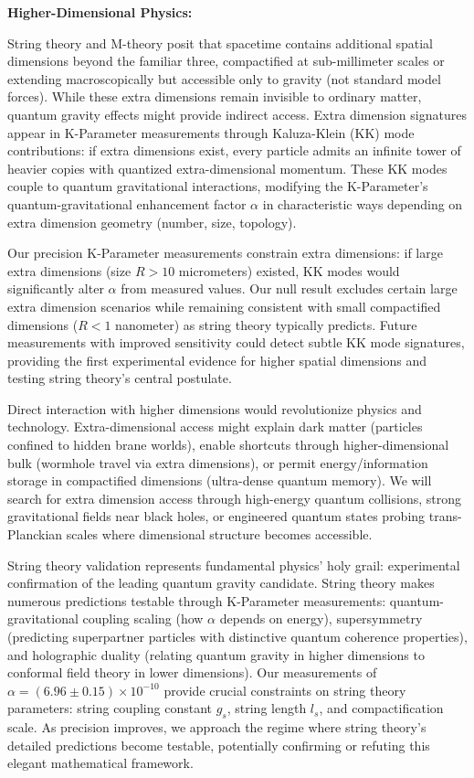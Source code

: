 \documentclass[11pt,a4paper,twoside]{article}
\begin{document}
\textbf{Higher-Dimensional Physics:}

String theory and M-theory posit that spacetime contains additional spatial dimensions beyond the familiar three, compactified at sub-millimeter scales or extending macroscopically but accessible only to gravity (not standard model forces). While these extra dimensions remain invisible to ordinary matter, quantum gravity effects might provide indirect access. Extra dimension signatures appear in K-Parameter measurements through Kaluza-Klein (KK) mode contributions: if extra dimensions exist, every particle admits an infinite tower of heavier copies with quantized extra-dimensional momentum. These KK modes couple to quantum gravitational interactions, modifying the K-Parameter's quantum-gravitational enhancement factor $\alpha$ in characteristic ways depending on extra dimension geometry (number, size, topology).

Our precision K-Parameter measurements constrain extra dimensions: if large extra dimensions (size $R > 10$ micrometers) existed, KK modes would significantly alter $\alpha$ from measured values. Our null result excludes certain large extra dimension scenarios while remaining consistent with small compactified dimensions ($R < 1$ nanometer) as string theory typically predicts. Future measurements with improved sensitivity could detect subtle KK mode signatures, providing the first experimental evidence for higher spatial dimensions and testing string theory's central postulate.

Direct interaction with higher dimensions would revolutionize physics and technology. Extra-dimensional access might explain dark matter (particles confined to hidden brane worlds), enable shortcuts through higher-dimensional bulk (wormhole travel via extra dimensions), or permit energy/information storage in compactified dimensions (ultra-dense quantum memory). We will search for extra dimension access through high-energy quantum collisions, strong gravitational fields near black holes, or engineered quantum states probing trans-Planckian scales where dimensional structure becomes accessible.

String theory validation represents fundamental physics' holy grail: experimental confirmation of the leading quantum gravity candidate. String theory makes numerous predictions testable through K-Parameter measurements: quantum-gravitational coupling scaling (how $\alpha$ depends on energy), supersymmetry (predicting superpartner particles with distinctive quantum coherence properties), and holographic duality (relating quantum gravity in higher dimensions to conformal field theory in lower dimensions). Our measurements of $\alpha = (6.96 \pm 0.15) \times 10^{-10}$ provide crucial constraints on string theory parameters: string coupling constant $g_s$, string length $l_s$, and compactification scale. As precision improves, we approach the regime where string theory's detailed predictions become testable, potentially confirming or refuting this elegant mathematical framework.
\end{document}
